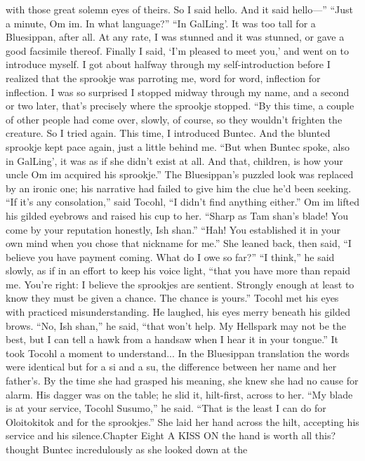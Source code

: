 \documentclass[9pt]{article}
\begin{document}
with those great solemn eyes of theirs. So I said hello. And it said hello—”
“Just a minute, Om im. In what language?”
“In GalLing’. It was too tall for a Bluesippan, after all. At any rate, I was stunned and it was stunned,
or gave a good facsimile thereof. Finally I said, ‘I’m pleased to meet you,’ and went on to introduce
myself. I got about halfway through my self-introduction before I realized that the sprookje was parroting
me, word for word, inflection for inflection. I was so surprised I stopped midway through my name, and
a second or two later, that’s precisely where the sprookje stopped.
“By this time, a couple of other people had come over, slowly, of course, so they wouldn’t frighten
the creature. So I tried again. This time, I introduced Buntec. And the blunted sprookje kept pace again,
just a little behind me.
“But when Buntec spoke, also in GalLing’, it was as if she didn’t exist at all. And that, children, is
how your uncle Om im acquired his sprookje.” The Bluesippan’s puzzled look was replaced by an ironic
one; his narrative had failed to give him the clue he’d been seeking.
“If it’s any consolation,” said Tocohl, “I didn’t find anything either.”
Om im lifted his gilded eyebrows and raised his cup to her. “Sharp as Tam shan’s blade! You come
by your reputation honestly, Ish shan.”
“Hah! You established it in your own mind when you chose that nickname for me.” She leaned back,
then said, “I believe you have payment coming. What do I owe so far?”
“I think,” he said slowly, as if in an effort to keep his voice light, “that you have more than repaid me.
You’re right: I believe the sprookjes are sentient. Strongly enough at least to know they must be given a
chance. The chance is yours.”
Tocohl met his eyes with practiced misunderstanding.
He laughed, his eyes merry beneath his gilded brows. “No, Ish shan,” he said, “that won’t help. My
Hellspark may not be the best, but I can tell a hawk from a handsaw when I hear it in your tongue.”
It took Tocohl a moment to understand... In the Bluesippan translation the words were identical but
for a si and a su, the difference between her name and her father’s.
By the time she had grasped his meaning, she knew she had no cause for alarm. His dagger was on
the table; he slid it, hilt-first, across to her. “My blade is at your service, Tocohl Susumo,” he said. “That
is the least I can do for Oloitokitok and for the sprookjes.”
She laid her hand across the hilt, accepting his service and his silence.Chapter Eight
A KISS ON the hand is worth all this? thought Buntec incredulously as she looked down at the
\end{document}
